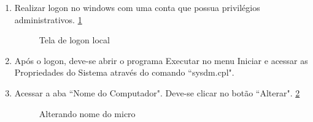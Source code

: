\begin{enumerate}
	\pagebreak
	\item {Realizar logon no windows com uma conta que possua privilégios administrativos. \ref{logon_local_adm}}
	\begin{figure}[ht]
   			\centering
   			\caption{Tela de logon local}
    		\label{logon_local_adm}
	\end{figure}

	\item {Após o logon, deve-se abrir o programa Executar no menu Iniciar e acessar as Propriedades do Sistema através do comando ``sysdm.cpl". }%



	\item {Acessar a aba ``Nome do Computador". Deve-se clicar no botão ``Alterar". \ref{alterar_nome_micro}}
	

		\begin{figure}[ht]
	   			\centering
	   			\caption{Alterando nome do micro}
	    		\label{alterar_nome_micro}
		\end{figure}
		

\end{enumerate}
